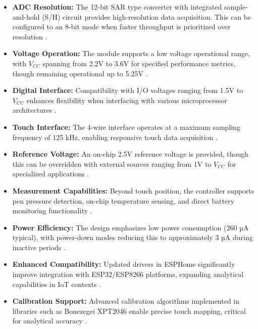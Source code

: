 \begin{itemize}
	\item \textbf{ADC Resolution:} The 12-bit SAR type converter with integrated sample-and-hold (S/H) circuit provides high-resolution data acquisition. This can be configured to an 8-bit mode when faster throughput is prioritized over resolution \cite{ xpt2046:2007}.
	
	\item \textbf{Voltage Operation:} The module supports a low voltage operational range, with $V_{CC}$ spanning from 2.2V to 3.6V for specified performance metrics, though remaining operational up to 5.25V \cite{ xpt2046:2007}.
	
	\item \textbf{Digital Interface:} Compatibility with I/O voltages ranging from 1.5V to $V_{CC}$ enhances flexibility when interfacing with various microprocessor architectures \cite{ xpt2046:2007}.
	
	\item \textbf{Touch Interface:} The 4-wire interface operates at a maximum sampling frequency of 125 kHz, enabling responsive touch data acquisition \cite{ xpt2046:2007}.
	
	\item \textbf{Reference Voltage:} An on-chip 2.5V reference voltage is provided, though this can be overridden with external sources ranging from 1V to $V_{CC}$ for specialized applications \cite{ xpt2046:2007}.
	
	\item \textbf{Measurement Capabilities:} Beyond touch position, the controller supports pen pressure detection, on-chip temperature sensing, and direct battery monitoring functionality \cite{ xpt2046:2007}.
	
	\item \textbf{Power Efficiency:} The design emphasizes low power consumption (260 µA typical), with power-down modes reducing this to approximately 3 µA during inactive periods \cite{ xpt2046:2007}.
	
	\item \textbf{Enhanced Compatibility:} Updated drivers in ESPHome significantly improve integration with ESP32/ESP8266 platforms, expanding analytical capabilities in IoT contexts \cite{ESPHome:2024}.
	
	\item \textbf{Calibration Support:} Advanced calibration algorithms implemented in libraries such as Bonezegei XPT2046 enable precise touch mapping, critical for analytical accuracy \cite{Bonezegei:2024}.
\end{itemize}





